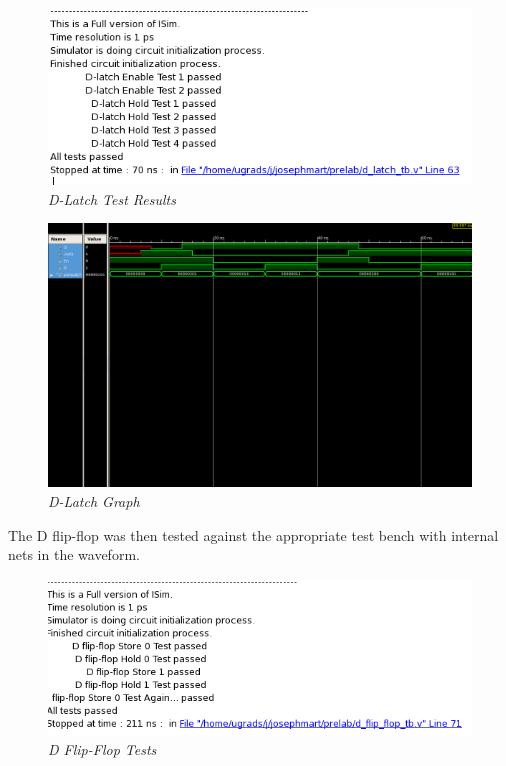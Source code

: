 \documentclass[a4paper,12pt]{article}
\begin{document}
  \begin{figure}[h]
    \begin{center}
      \includegraphics[scale=0.7]{D_latch_tests.png}
      \caption{\textit{D-Latch Test Results}}
    \end{center}
  \end{figure}  
  
  \newpage
  
  \begin{figure}[h]
    \begin{center}
      \includegraphics[scale=0.2]{D_latch_graph.png}
      \caption{\textit{D-Latch Graph}}
    \end{center}
  \end{figure}
  
  The D flip-flop was then tested against the appropriate test bench
  with internal nets in the waveform.
  
  \begin{figure}[h]
    \begin{center}
      \includegraphics[scale=0.7]{Master_Slave_D_flip_flop_tests.png}
      \caption{\textit{D Flip-Flop Tests}}
    \end{center}
  \end{figure}
  
\end{document}
